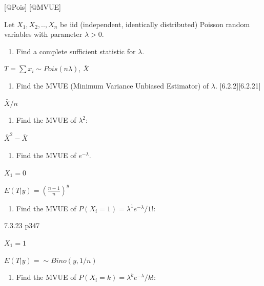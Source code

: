 \documentclass[6pt,Portrait]{article}
\providecommand{\tightlist}{%
  \setlength{\itemsep}{0pt}\setlength{\parskip}{0pt}}
\begin{document}
{[}@Pois{]} {[}@MVUE{]}

Let \(X_1,X_2,..,X_n\) be iid (independent, identically distributed)
Poisson random variables with parameter \(\lambda>0\).

\begin{enumerate}
\def\labelenumi{(\alph{enumi})}
\tightlist
\item
  Find a complete sufficient statistic for \(\lambda\).
\end{enumerate}

\(T=\sum x_i\sim Pois(n\lambda)\), \(\bar X\)

\begin{enumerate}
\def\labelenumi{(\alph{enumi})}
\setcounter{enumi}{1}
\tightlist
\item
  Find the MVUE (Minimum Variance Unbiased Estimator) of \(\lambda\).
  {[}6.2.2{]}{[}6.2.21{]}
\end{enumerate}

\(\bar X/n\)

\begin{enumerate}
\def\labelenumi{(\alph{enumi})}
\setcounter{enumi}{2}
\tightlist
\item
  Find the MVUE of \(\lambda^2\):
\end{enumerate}

\(\bar X^2-\bar X\)

\begin{enumerate}
\def\labelenumi{(\alph{enumi})}
\setcounter{enumi}{3}
\tightlist
\item
  Find the MVUE of \(e^{-\lambda}\).
\end{enumerate}

\(X_1=0\)

\(E(T|y)=(\frac{n-1}{n})^y\)

\begin{enumerate}
\def\labelenumi{(\alph{enumi})}
\setcounter{enumi}{4}
\tightlist
\item
  Find the MVUE of \(P(X_i=1)=\lambda^1e^{-\lambda}/1!\):
\end{enumerate}

7.3.23 p347

\(X_1=1\)

\(E(T|y)= \sim Bino(y,1/n)\)

\begin{enumerate}
\def\labelenumi{(\alph{enumi})}
\setcounter{enumi}{5}
\tightlist
\item
  Find the MVUE of \(P(X_i=k)=\lambda^ke^{-\lambda}/k!\):
\end{enumerate}
\end{document}
